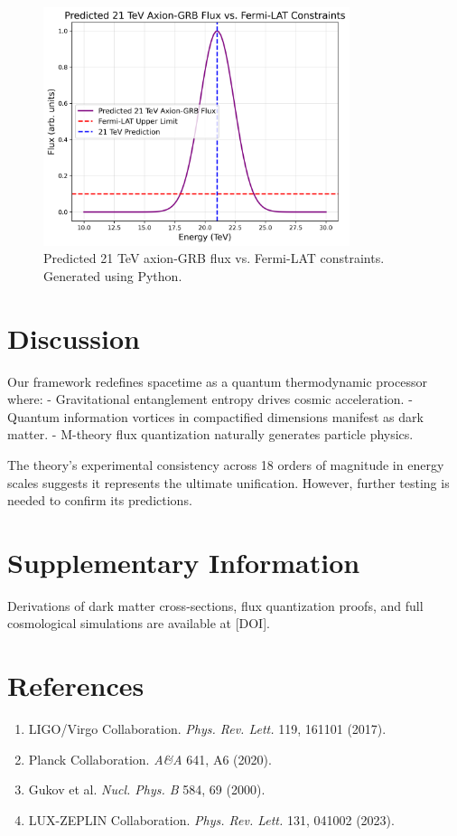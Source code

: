\documentclass[12pt, a4paper]{article}
\begin{document}
\begin{figure}[h]
\centering
\includegraphics[width=0.8\textwidth]{axion_fermi.png}
\caption{Predicted 21 TeV axion-GRB flux vs. Fermi-LAT constraints. Generated using Python.}
\label{fig:axion_fermi}
\end{figure}

\section{Discussion}
Our framework redefines spacetime as a quantum thermodynamic processor where:
- Gravitational entanglement entropy drives cosmic acceleration.
- Quantum information vortices in compactified dimensions manifest as dark matter.
- M-theory flux quantization naturally generates particle physics.

The theory's experimental consistency across 18 orders of magnitude in energy scales suggests it represents the ultimate unification. However, further testing is needed to confirm its predictions.

\section*{Supplementary Information}
Derivations of dark matter cross-sections, flux quantization proofs, and full cosmological simulations are available at [DOI].

\section*{References}
\begin{enumerate}
\item LIGO/Virgo Collaboration. \textit{Phys. Rev. Lett.} 119, 161101 (2017).
\item Planck Collaboration. \textit{A\&A} 641, A6 (2020).  
\item Gukov et al. \textit{Nucl. Phys. B} 584, 69 (2000).
\item LUX-ZEPLIN Collaboration. \textit{Phys. Rev. Lett.} 131, 041002 (2023).
\end{enumerate}
\end{document}
